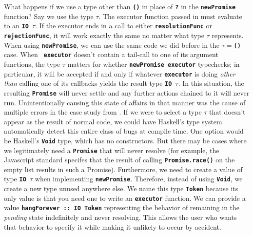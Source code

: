 \documentclass[12pt, english, letterpaper]{kuthesis}
\newcommand{\lit}[1]{\textbf{\texttt{#1}}}
\begin{document}
What happens if we use a type other than \lit{()} in place of \lit ? in the \lit{newPromise} function?  Say we use the type $\tau$.  The executor function passed in must evaluate to an \lit{IO $\tau$}.  If the executor ends in a call to either \lit{resolutionFunc} or \lit{rejectionFunc}, it will work exactly the same no matter what type $\tau$ represents.  When using \lit{newPromise}, we can use the same code we did before in the \lit{$\tau = $()} case.  When \lit{ executor} doesn't contain a tail-call to one of its argument functions, the type $\tau$ matters for whether \lit{newPromise executor} typechecks; in particular, it will be accepted if and only if whatever \lit{executor} is doing \emph{other than} calling one of its callbacks yields the result type \lit{IO $\tau$}. In this situation, the resulting \lit{Promise} will never settle and any further actions chained to it will never run.  Unintentionally causing this state of affairs in that manner was the cause of multiple errors in the case study from \cite{madsen}. If we were to select a type $\tau$ that doesn't appear as the result of normal code, we could have Haskell's type system automatically detect this entire class of bugs at compile time.  One option would be Haskell's \lit{Void} type, which has no constructors.  But there may be cases where we legitimately need a \lit{Promise} that will never resolve (for example, the Javascript standard specifes that the result of calling \lit{Promise.race()} on the empty list results in such a \textsf{Promise}).  Furthermore, we need to create a value of type \lit{IO $\tau$} when implementing \lit{newPromise}.  Therefore, instead of using \lit{Void}, we create a new type unused anywhere else.  We name this type \lit{Token} because its only value is that you need one to write an \lit{executor} function.  We can provide a value \lit{hangForever ::\ IO Token} representing the behavior of remaining in the \emph{pending} state indefinitely and never resolving.  This allows the user who wants that behavior to specify it while making it unlikely to occur by accident.
\end{document}
